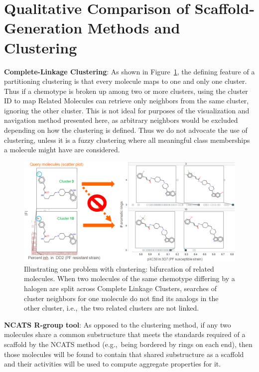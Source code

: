 \documentclass[11pt,letterpaper]{article}
\newcommand*\fref[1]{Figure~\ref{fig:#1}}
\newcommand*\eg{e.g.,~}
\newcommand*\ie{i.e.,~}
\begin{document}
\newpage 

\section{Qualitative Comparison of Scaffold-Generation Methods and Clustering}\label{sec:qualcomp}
{\bf Complete-Linkage Clustering}: As shown in \fref{clusterlanes}, the defining feature of a partitioning clustering is that every molecule maps to one and only one cluster. Thus if a chemotype is broken up among two or more clusters, using the cluster ID to map Related Molecules can retrieve only neighbors from the same cluster, ignoring the other cluster. This is not ideal for purposes of the visualization and navigation method presented here, as arbitrary neighbors would be excluded depending on how the clustering is defined.  Thus we do not advocate the use of clustering, unless it is a fuzzy clustering where all meaningful class memberships a molecule might have are considered. 

\begin{figure}
\includegraphics[width=6in]{../fig/clusterlanes.png}
\caption{Illustrating one problem with clustering: bifurcation of related molecules.  When two molecules of the same chemotype differing by a halogen are split across Complete Linkage Clusters, searches of cluster neighbors for one molecule do not find its analogs in the other cluster, \ie the two related clusters are not linked.}
\label{fig:clusterlanes}
\end{figure}



{\bf NCATS R-group tool}: As opposed to the clustering method, 
if any two molecules share a common substructure that meets the standards required of a scaffold by the NCATS method (\eg being bordered by rings on each end), then those molecules will be found to contain that shared substructure as a scaffold and their activities will be used to compute aggregate properties for it. 
\end{document}
